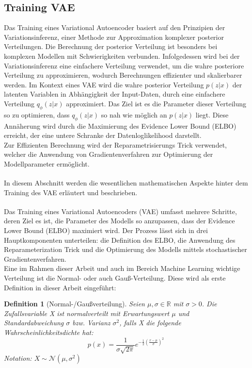 \documentclass[%
thesis=student,%
coverpage=false,%
titlepage=false,%
headmarks=true, %
german,%
font=libertine, %
math=newpxtx, %
BCOR=5mm,%
coverBCOR=11mm%
]{tumbook}
\theoremstyle{break}
\newtheorem{definition}{Definition}[section]
\begin{document}
\subsection{Training VAE}
Das Training eines Variational Autoencoder basiert auf den Prinzipien der Variationsinferenz, einer Methode zur Approximation komplexer posterior Verteilungen. Die Berechnung der posterior Verteilung ist besonders bei komplexen Modellen mit Schwierigkeiten verbunden. Infolgedessen wird bei der Variationsinferenz eine einfachere Verteilung verwendet, um die wahre posteriore Verteilung zu approximieren, wodurch Berechnungen effizienter und skalierbarer werden.
Im Kontext eines VAE wird die wahre posterior Verteilung $p(z|x)$ der latenten Variablen in Abhängigkeit der Input-Daten, durch eine einfachere Verteilung $q_\phi(z|x)$ approximiert. Das Ziel ist es die Parameter dieser Verteilung so zu optimieren, dass $q_\phi(z|x)$ so nah wie möglich an $p(z|x)$ liegt. Diese Annäherung wird durch die Maximierung des Evidence Lower Bound (ELBO) erreicht, der eine untere Schranke der Datenloglikelihood darstellt. \\
Zur Effizienten Berechnung wird der Reparametrisierungs Trick verwendet, welcher die Anwendung von Gradientenverfahren zur Optimierung der Modellparameter ermöglicht.\\
\\
In diesem Abschnitt werden die wesentlichen mathematischen Aspekte hinter dem Training des VAE erläutert und beschrieben.\\
\\
Das Training eines Variational Autoencoders (VAE) umfasst mehrere Schritte, deren Ziel es ist, die Parameter des Modells so anzupassen, dass der Evidence Lower Bound (ELBO) maximiert wird. Der Prozess lässt sich in drei Hauptkomponenten unterteilen: die Definition des ELBO, die Anwendung des Reparameterization Trick und die Optimierung des Modells mittels stochastischer Gradientenverfahren.\\
Eine im Rahmen dieser Arbeit und auch im Bereich Machine Learning wichtige Verteilung ist die Normal- oder auch Gauß-Verteilung. Diese wird als erste Definition in dieser Arbeit eingeführt:
\begin{definition}[Normal-/Gaußverteilung]
	Seien $\mu, \sigma \in \mathbb{R}$ mit $\sigma > 0$.
	Die Zufallsvariable X ist normalverteilt mit Erwartungswert $\mu$ und Standardabweichung $\sigma$ bzw. Varianz $\sigma^2$, falls X die folgende Wahrscheinlichkeitsdichte hat: 
	$$ p(x) = \frac{1}{\sigma \sqrt{2\pi}} e^{-\frac{1}{2}(\frac{x-\mu}{\sigma})^2}$$
	Notation: $X \sim \mathcal{N}(\mu, \sigma^2)$
	\label{def:Normalverteilung}
\end{definition}\noindent
\end{document}

